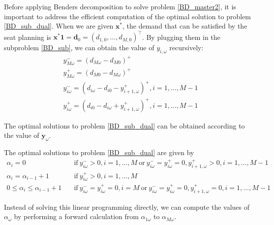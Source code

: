 Before applying Benders decomposition to solve problem \eqref{BD_master2}, it is important to address the efficient computation of the optimal solution to problem \eqref{BD_sub_dual}.
When we are given $\mathbf{x}^{*}$, the demand that can be satisfied by the seat planning is $\mathbf{x}^{*} \mathbf{1} = \mathbf{d}_0 = (d_{1,0},\ldots,d_{M,0})^{\intercal}$.
By plugging them in the subproblem \eqref{BD_sub}, we can obtain the value of $y_{i, \omega}$ recursively:
\begin{equation}\label{y_recursively}
\begin{aligned}
  & y_{M \omega}^{-}=\left(d_{M \omega}-d_{M 0}\right)^{+} \\
  & y_{M \omega}^{+}=\left(d_{M 0}-d_{M \omega}\right)^{+} \\
  & y_{i \omega}^{-}=\left(d_{i \omega}-d_{i 0} - y_{i+1, \omega}^{+} \right)^{+}, i =1,\ldots, M-1 \\
  & y_{i \omega}^{+}=\left(d_{i 0}- d_{i \omega} + y_{i+1, \omega}^{+}\right)^{+}, i =1,\ldots, M-1
\end{aligned}
\end{equation}

The optimal solutions to problem \eqref{BD_sub_dual} can be obtained according to the value of $\mathbf{y}_{\omega}$.

\begin{prop}\label{optimal_sol_sub_dual}
  The optimal solutions to problem \eqref{BD_sub_dual} are given by 
\begin{equation}\label{BD_sub_simplified}
  \begin{aligned}
    \alpha_{i} = 0 \quad & \text{if}~  y_{i \omega}^{-} > 0,  i =1,\ldots, M~\text{or}~ y_{i \omega}^{-} = y_{i \omega}^{+} = 0, y_{i+1, \omega}^{+}> 0, i = 1,\ldots, M-1 \\
    \alpha_{i} = \alpha_{i-1}+1 \quad & \text{if}~ y_{i \omega}^{+} > 0, i =1,\ldots, M \\
    0 \leq \alpha_{i} \leq \alpha_{i-1}+1 \quad & \text{if}~ y_{i \omega}^{-} = y_{i \omega}^{+} = 0, i = M~\text{or}~ y_{i \omega}^{-} = y_{i \omega}^{+} = 0, y_{i+1, \omega}^{+}= 0, i = 1,\ldots, M-1
  \end{aligned}
\end{equation}
\end{prop}

Instead of solving this linear programming directly, we can compute the values of $\alpha_{\omega}$ by performing a forward calculation from $\alpha_{1\omega}$ to $\alpha_{M\omega}$.

